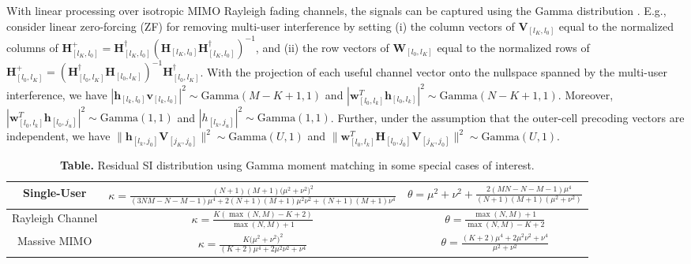 \documentclass[onecolumn]{IEEEtran}
\begin{document}
With linear processing over isotropic MIMO Rayleigh fading channels, the signals can be captured using the Gamma distribution \cite{7478073}. 
E.g., consider linear zero-forcing (ZF) for removing multi-user interference by setting (i) the column vectors of $\boldsymbol{V}_{[l_{K},l_{0}]}$ equal to the normalized columns of $\boldsymbol{H}^{+}_{[l_{K},l_{0}]} = \boldsymbol{H}^{\dag}_{[l_{K},l_{0}]} ( \boldsymbol{H}_{[l_{K},l_{0}]} \boldsymbol{H}^{\dag}_{[l_{K},l_{0}]} )^{-1}$, and (ii) the row vectors of $\boldsymbol{W}_{[l_{0},l_{K}]}$ equal to the normalized rows of $\boldsymbol{H}^{+}_{[l_{0},l_{K}]} = ( \boldsymbol{H}^{\dag}_{[l_{0},l_{K}]} \boldsymbol{H}_{[l_{0},l_{K}]} )^{-1} \boldsymbol{H}^{\dag}_{[l_{0},l_{K}]}$. With the projection of each useful channel vector onto the nullspace spanned by the multi-user interference, we have $| \boldsymbol{h}_{[l_{k},l_{0}]} \boldsymbol{v}_{[l_{k},l_{0}]} |^2 \sim \text{Gamma} (M - K + 1,1) $ and $| \boldsymbol{w}^{T}_{[l_{0},l_{k}]} \boldsymbol{h}_{[l_{0},l_{k}]} |^2 \sim \text{Gamma} (N - K + 1,1)$. Moreover, $| \boldsymbol{w}^{T}_{[l_{0},l_{k}]} \boldsymbol{h}_{[l_{0},j_{u}]} |^{2} \sim \text{Gamma} (1,1)$ and $| h_{[l_{k},j_{u}]} |^2 \sim \text{Gamma} (1 ,1)$. Further, under the assumption that the outer-cell precoding vectors are independent, we have $\| \boldsymbol{h}_{[l_{k},j_{0}]} \boldsymbol{V}_{[j_{K},j_{0}]} \|^2 \sim \text{Gamma} (U,1)$ and $\| \boldsymbol{w}^{T}_{[l_{0},l_{k}]} \boldsymbol{H}_{[l_{0},j_{0}]} \boldsymbol{V}_{[j_{K},j_{0}]} \|^{2} \sim \text{Gamma} (U,1)$. 

\begin{table*}[!t] 
\centering 
\renewcommand{\arraystretch}{1.5}
\begin{tabular}{|c| c| c|}
\hline
{\small Single-User} & $\kappa = \tfrac{(N + 1)(M + 1) \big(\mu^2 + \nu^2 \big)^2}{ (3 N M - N - M - 1) \mu^4  + 2 (N + 1) (M + 1) \mu^2 \nu^2 + (N + 1) (M + 1) \nu^4}$ & $\theta = \mu ^2+\nu ^2+\tfrac{2 (M N - N - M - 1) \mu^4}{(N+1) (M+1) (\mu^2 + \nu^2)}$ \\  
\hline 
{\small Rayleigh Channel} & $\kappa = \tfrac{K (\max (N,M) - K + 2)}{\max (N,M) + 1} $ & $\theta = \tfrac{\max (N,M) + 1}{\max (N,M) - K + 2}$ \\  
\hline 
{\small Massive MIMO} & $\kappa = \tfrac{K \big( \mu^2 + \nu^2 \big)^2}{(K+2) \mu^4 + 2 \mu^2 \nu^2 + \nu^4}$ & $\theta = \tfrac{(K+2) \mu^4 + 2 \mu^2 \nu^2 + \nu^4}{\mu^2 + \nu^2}$ \\ 
\hline 
\end{tabular}
\caption*{{\small \textbf{Table.} Residual SI distribution using Gamma moment matching in some special cases of interest.}}
\label{tbl:SpecialCases}
\end{table*}
\end{document}
